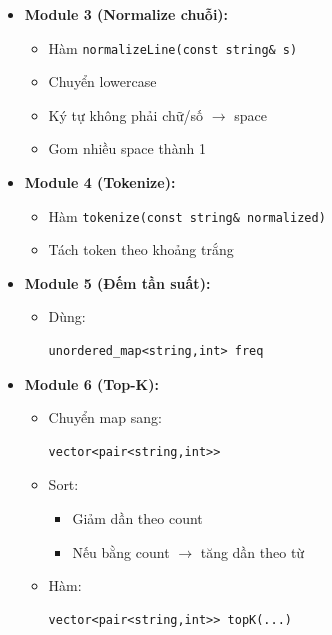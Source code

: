 \begin{itemize}
\begin{itemize}
        \item \textbf{Module 3 (Normalize chuỗi):}

        \begin{itemize}
            \item Hàm \texttt{normalizeLine(const string\& s)}
            \item Chuyển lowercase
            \item Ký tự không phải chữ/số $\rightarrow$ space
            \item Gom nhiều space thành 1
        \end{itemize}

        \item \textbf{Module 4 (Tokenize):}

        \begin{itemize}
            \item Hàm \texttt{tokenize(const string\& normalized)}
            \item Tách token theo khoảng trắng
        \end{itemize}

        \item \textbf{Module 5 (Đếm tần suất):}

        \begin{itemize}
            \item Dùng:
\begin{lstlisting}
unordered_map<string,int> freq
\end{lstlisting}
        \end{itemize}

        \item \textbf{Module 6 (Top-K):}

        \begin{itemize}
            \item Chuyển map sang:
\begin{lstlisting}
vector<pair<string,int>>
\end{lstlisting}

            \item Sort:
            \begin{itemize}
                \item Giảm dần theo count
                \item Nếu bằng count $\rightarrow$ tăng dần theo từ
            \end{itemize}

            \item Hàm:
\begin{lstlisting}
vector<pair<string,int>> topK(...)
\end{lstlisting}
        \end{itemize}


\end{itemize}
\end{itemize}
